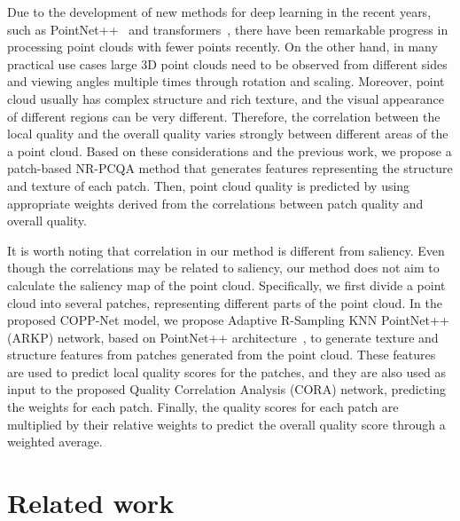 \documentclass[conference]{IEEEtran}
\begin{document}
Due to the development of new methods for deep learning in the recent years, such as PointNet++~\cite{qi2017pointnet++} and transformers~\cite{vaswani2017attention}, there have been remarkable progress in processing point clouds with fewer points recently. On the other hand, in many practical use cases large 3D point clouds need to be observed from different sides and viewing angles multiple times through rotation and scaling. Moreover, point cloud usually has complex structure and rich texture, and the visual appearance of different regions can be very different. Therefore, the correlation between the local quality and the overall quality varies strongly between different areas of the a point cloud.  Based on these considerations and the previous work, we propose a patch-based NR-PCQA method that generates features representing the structure and texture of each patch. Then, point cloud quality is predicted by using appropriate weights derived from the correlations between patch quality and overall quality. 

It is worth noting that correlation in our method is different from saliency. Even though the correlations may be related to saliency, our method does not aim to calculate the saliency map of the point cloud. Specifically, we first divide a point cloud into several patches, representing different parts of the point cloud. In the proposed COPP-Net model, we propose Adaptive R-Sampling KNN PointNet++ (ARKP) network, based on PointNet++ architecture~\cite{qi2017pointnet++}, to generate texture and structure features from patches generated from the point cloud. These features are used to predict local quality scores for the patches, and they are also used as input to the proposed Quality Correlation Analysis (CORA) network, predicting the weights for each patch. Finally, the quality scores for each patch are multiplied by their relative weights to predict the overall quality score through a weighted average.






\section{Related work}
\end{document}
